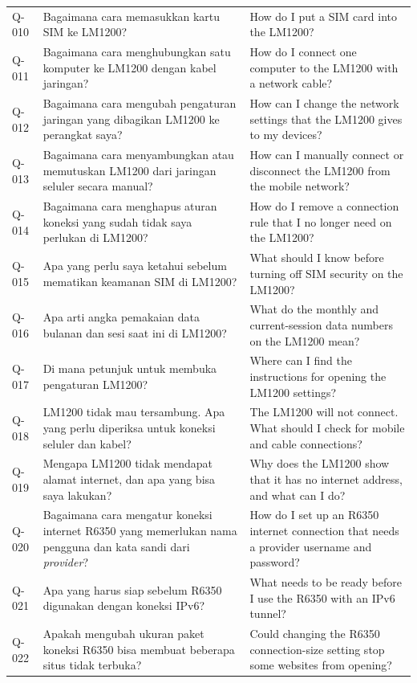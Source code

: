 \begin{longtable}{@{}>{\RaggedRight\arraybackslash}p{1.6cm}>{\RaggedRight\arraybackslash}p{5.8cm}>{\RaggedRight\arraybackslash}p{\dimexpr\textwidth-1.6cm-5.8cm-4\tabcolsep\relax}@{}}
Q-010 & Bagaimana cara memasukkan kartu SIM ke LM1200? & How do I put a SIM card into the LM1200? \\
Q-011 & Bagaimana cara menghubungkan satu komputer ke LM1200 dengan kabel jaringan? & How do I connect one computer to the LM1200 with a network cable? \\
Q-012 & Bagaimana cara mengubah pengaturan jaringan yang dibagikan LM1200 ke perangkat saya? & How can I change the network settings that the LM1200 gives to my devices? \\
Q-013 & Bagaimana cara menyambungkan atau memutuskan LM1200 dari jaringan seluler secara manual? & How can I manually connect or disconnect the LM1200 from the mobile network? \\
Q-014 & Bagaimana cara menghapus aturan koneksi yang sudah tidak saya perlukan di LM1200? & How do I remove a connection rule that I no longer need on the LM1200? \\
Q-015 & Apa yang perlu saya ketahui sebelum mematikan keamanan SIM di LM1200? & What should I know before turning off SIM security on the LM1200? \\
Q-016 & Apa arti angka pemakaian data bulanan dan sesi saat ini di LM1200? & What do the monthly and current-session data numbers on the LM1200 mean? \\
Q-017 & Di mana petunjuk untuk membuka pengaturan LM1200? & Where can I find the instructions for opening the LM1200 settings? \\
Q-018 & LM1200 tidak mau tersambung. Apa yang perlu diperiksa untuk koneksi seluler dan kabel? & The LM1200 will not connect. What should I check for mobile and cable connections? \\
Q-019 & Mengapa LM1200 tidak mendapat alamat internet, dan apa yang bisa saya lakukan? & Why does the LM1200 show that it has no internet address, and what can I do? \\
Q-020 & Bagaimana cara mengatur koneksi internet R6350 yang memerlukan nama pengguna dan kata sandi dari \emph{provider}? & How do I set up an R6350 internet connection that needs a provider username and password? \\
Q-021 & Apa yang harus siap sebelum R6350 digunakan dengan koneksi IPv6? & What needs to be ready before I use the R6350 with an IPv6 tunnel? \\
Q-022 & Apakah mengubah ukuran paket koneksi R6350 bisa membuat beberapa situs tidak terbuka? & Could changing the R6350 connection-size setting stop some websites from opening? \\

\end{longtable}
